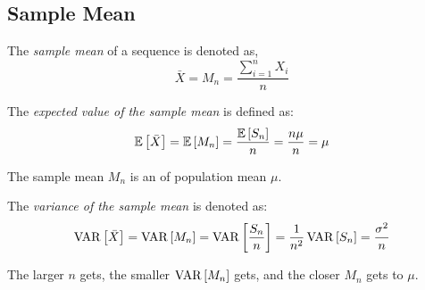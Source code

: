 	\subsection{Sample Mean} \label{subsec:Sample Mean}
		\begin{definition} \label{def:Sample Mean}
			The \emph{sample mean} of a sequence is denoted as,
			\begin{equation} \label{eq:Sample Mean}
				\bar{X} = M_{n} = \frac{\sum_{i=1}^{n} X_{i}}{n}
			\end{equation}
		\end{definition}
		\begin{definition} \label{def:Expected Value of Sample Mean}
			The \emph{expected value of the sample mean} is defined as:
			\begin{equation} \label{eq:Expected Value of Sample Mean}
				\operatorname{\operatorname{\mathbb{E}}} \left[ \bar{X} \right]
				= \operatorname{\operatorname{\mathbb{E}}} \left[ M_{n} \right]
				= \frac{\operatorname{\operatorname{\mathbb{E}}} \left[ S_{n} \right]}{n}
				= \frac{n \mu}{n}
				= \mu
			\end{equation}
			\begin{remark}
				The sample mean $M_{n}$ is an \emph{} of population mean $\mu$.
			\end{remark}
		\end{definition}
		\begin{definition} \label{def:Variance of Sample Mean}
			The \emph{variance of the sample mean} is denoted as:
			\begin{equation} \label{eq:Variance of Sample Mean}
				\operatorname{\operatorname{VAR}} \left[ \bar{X} \right]
				= \operatorname{\operatorname{VAR}} \left[ M_{n} \right]
				= \operatorname{\operatorname{VAR}} \left[ \frac{S_{n}}{n} \right]
				= \frac{1}{n^{2}} \operatorname{\operatorname{VAR}} \left[ S_{n} \right]
				= \frac{\sigma^{2}}{n}
			\end{equation}
			\begin{remark}
				The larger $n$ gets, the smaller $\operatorname{\operatorname{VAR}} \left[ M_{n} \right]$ gets, and the closer $M_{n}$ gets to $\mu$.
			\end{remark}
		\end{definition}
			

